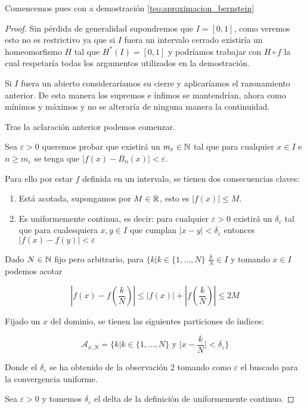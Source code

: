 Comencemos pues con a demostración \ref{teo:aproximacion_bernstein}
\begin{proof}
    Sin pérdida de generalidad supondremos que $I=[0,1]$, como veremos esto no es restrictivo ya que 
    si $I$ fuera un intervalo cerrado existiría un homeomorfismo $H$ tal que $H^*(I)=[0,1]$ y podríamos
    trabajar con $H \circ f$ la cual respetaría todas los argumentos utilizados en la demostración. 

    Si $I$ fuera un abierto consideraríamos su cierre y aplicaríamos el razonamiento anterior. 
    De esta manera los supremos e ínfimos se mantendrían, ahora como mínimos y máximos y no se alteraría
    de ninguna manera la continuidad. 

    Tras la aclaración anterior podemos comenzar.
    
    Sea $\varepsilon > 0$ queremos probar que existirá un $m_\varepsilon  \in \mathbb{N}$ tal que para 
    cualquier $x \in I$ e $n \geq m_\varepsilon$  se tenga que 
    $|f(x) - B_n(x)| < \varepsilon$.
    
     Para ello por estar $f$ definida en un intervalo, 
    se tienen dos consecuencias claves: 
    \begin{enumerate}
        \item Está acotada, supongamos por $M \in \mathbb{R}$, esto es $|f(x)| \leq M$.
        \item Es uniformemente continua, es decir: para cualquier $\varepsilon >0$ existirá un $\delta_\varepsilon$
        tal que para cualesquiera $x,y \in I$ que cumplan $|x-y| < \delta_\varepsilon$ entonces $|f(x)-f(y)| < \varepsilon$
    \end{enumerate}
    
    
    Dado $N \in  \mathbb{N}$ fijo pero arbitrario, para $\{ k | k \in \{1, ..., N\}$
    $\frac{k}{N} \in I$ y tomando $x \in I$ podemos acotar

    $$|f(x)- f\left( \frac{k}{N} \right) | \leq |f(x)| + |f(\frac{k}{N})|\leq 2M$$

    
    Fijado un $x$ del dominio, se tienen las siguientes particiones de índices: 
    
    $$\mathcal{A}_{x,N} = \{ k | k \in \{1, ..., N\} \text{ y }  |x- \frac{k}{N}| < \delta_\varepsilon \}$$

    Donde el $\delta_\varepsilon$ se ha obtenido de la observación 2 tomando como $\varepsilon$ el 
    buscado para la convergencia uniforme. 
 
    Sea $\varepsilon > 0$ y tomemos $\delta_ \varepsilon$ el delta de la definición de uniformemente continuo.
    

\end{proof}
